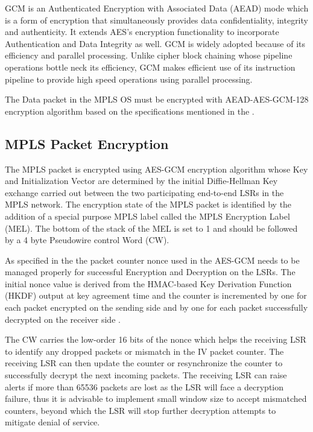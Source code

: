 GCM is an Authenticated Encryption with Associated Data (AEAD) mode which is a form of encryption that simultaneously provides data confidentiality, integrity and authenticity. It extends AES's encryption functionality to incorporate Authentication and Data Integrity as well. GCM is widely adopted because of its efficiency and parallel processing. Unlike cipher block chaining whose pipeline operations bottle neck its efficiency, GCM makes efficient use of its instruction pipeline to provide high speed operations using parallel processing.

The Data packet in the MPLS OS must be encrypted with AEAD-AES-GCM-128 encryption algorithm based on the specifications mentioned in the \cite{rfc7296}.

\subsection{MPLS Packet Encryption}
The MPLS packet is encrypted using AES-GCM encryption algorithm whose Key and Initialization Vector are determined by the initial Diffie-Hellman Key exchange carried out between the two participating end-to-end LSRs in the MPLS network. The encryption state of the MPLS packet is identified by the addition of a special purpose MPLS label called the MPLS Encryption Label (MEL). The bottom of the stack of the MEL is set to 1 and should be followed by a 4 byte Pseudowire control Word (CW).

As specified in the \cite{rfc7296} the packet counter nonce used in the AES-GCM needs to be managed properly for successful Encryption and Decryption on the LSRs. The initial nonce value is derived from the HMAC-based Key Derivation Function (HKDF) output at key agreement time and the counter is incremented by one for each packet encrypted on the sending side and by one for each packet successfully decrypted on the receiver side \cite{mpls-os-internet-draft}.

The CW carries the low-order 16 bits of the nonce which helps the receiving LSR to identify any dropped packets or mismatch in the IV packet counter. The receiving LSR can then update the counter or resynchronize the counter to successfully decrypt the next incoming packets. The receiving LSR can raise alerts if more than 65536 packets are lost as the LSR will face a decryption failure, thus it is advisable to implement small window size to accept mismatched counters, beyond which the LSR will stop further decryption attempts to mitigate denial of service.


